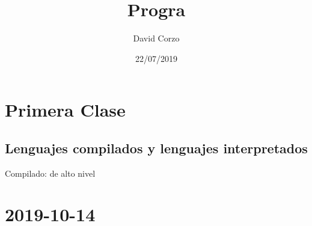 \documentclass{book}
\title{Progra}
\author{David Corzo}
\date{22/07/2019}
\begin{document}
\maketitle

\chapter{Primera Clase}
\section{Lenguajes compilados y lenguajes interpretados}
Compilado: de alto nivel \newline 


\chapter{2019-10-14}

\end{document}
